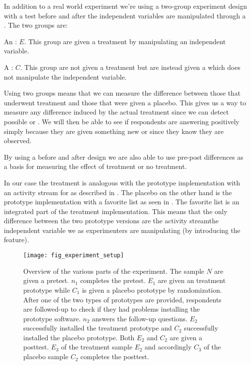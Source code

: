 In addition to a real world experiment we're using a two-group experiment
design with a test before and after the independent variables are
manipulated through a .
The two groups are:

\begin{items}
  \item An : $E$. This group are given a treatment by
    manipulating an independent variable.
  \item A : $C$. This group are not given a treatment but
    are instead given a  which does not manipulate the
    independent variable.
\end{items}

Using two groups means that we can measure the difference between those that
underwent treatment and those that were given a placebo. This gives us a way
to measure any difference induced by the actual treatment since we can detect
possible  or .
We will then be able to see if respondents are answering positively simply
because they are given something new or since they know they are
observed.

By using a before and after design we are also able to use pre-post
differences as a basis for measuring the effect of treatment or no
treatment.

In our case the treatment is analogous with the prototype implementation with
an activity stream for \urort{} as described in
.
The placebo on the other hand is the 
prototype implementation with a favorite list as seen in
.
The favorite list is an integrated part of the treatment implementation.
This means that the only difference between the two prototype versions are
the activity stream\dash{}the independent variable we as experimenters are
manipulating (by introducing the feature).

\begin{figure}
  \texttt{[image: fig\_experiment\_setup]}
  \caption[Experiment Overview]{
    Overview of the various parts of the experiment. The sample $N$
    are given a pretest. $n_1$ completes the pretest. $E_1$ are given
    an treatment prototype while $C_1$ is given a placebo
    prototype by randomization.
    After one of the two types of prototypes are provided, respondents are
    followed-up to check if they had problems installing the prototype
    software. $n_2$ answers the follow-up questions.
    $E_2$ successfully installed the treatment prototype and $C_2$
    successfully installed the placebo prototype. Both $E_2$ and $C_2$ are
    given a posttest.
    $E_3$ of the treatment sample $E_2$ and accordingly $C_3$ of the
    placebo sample $C_2$ completes the posttest.
  }
  \label{figure:fig.experiment.setup}
\end{figure}

